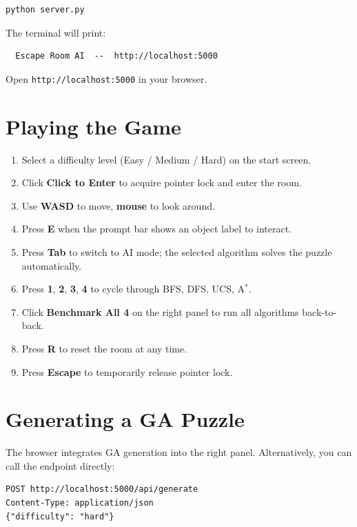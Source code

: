\documentclass[12pt, a4paper]{report}
\begin{document}
\begin{verbatim}
python server.py
\end{verbatim}

The terminal will print:

\begin{verbatim}
  Escape Room AI  --  http://localhost:5000
\end{verbatim}

Open \texttt{http://localhost:5000} in your browser.

\section{Playing the Game}

\begin{enumerate}[leftmargin=1.5em]
  \item Select a difficulty level (Easy / Medium / Hard) on the start screen.
  \item Click \textbf{Click to Enter} to acquire pointer lock and enter the
        room.
  \item Use \textbf{WASD} to move, \textbf{mouse} to look around.
  \item Press \textbf{E} when the prompt bar shows an object label to interact.
  \item Press \textbf{Tab} to switch to AI mode; the selected algorithm solves
        the puzzle automatically.
  \item Press \textbf{1}, \textbf{2}, \textbf{3}, \textbf{4} to cycle through
        BFS, DFS, UCS, A$^{\ast}$.
  \item Click \textbf{Benchmark All 4} on the right panel to run all algorithms
        back-to-back.
  \item Press \textbf{R} to reset the room at any time.
  \item Press \textbf{Escape} to temporarily release pointer lock.
\end{enumerate}

\section{Generating a GA Puzzle}

The browser integrates GA generation into the right panel.  Alternatively, you
can call the endpoint directly:

\begin{verbatim}
POST http://localhost:5000/api/generate
Content-Type: application/json
{"difficulty": "hard"}
\end{verbatim}
\end{document}
